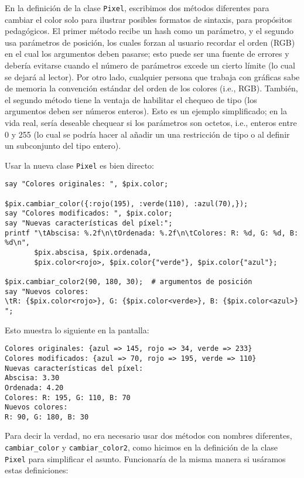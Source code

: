 En la definición de la clase {\tt Pixel}, escribimos dos métodos
diferentes para cambiar el color solo para ilustrar posibles 
formatos de sintaxis, para propósitos pedagógicos. El primer método
recibe un hash como un parámetro, y el segundo usa parámetros de posición,
los cuales forzan al usuario recordar el orden (RGB) en el cual los
argumentos deben pasarse; esto puede ser una fuente de errores y 
debería evitarse cuando el número de parámetros excede un cierto 
límite (lo cual se dejará al lector). Por otro lado, cualquier 
persona que trabaja con gráficas sabe de memoria la convención estándar 
del orden de los colores (i.e., RGB). También, el segundo método
tiene la ventaja de habilitar el chequeo de tipo (los argumentos
deben ser números enteros). Esto es un ejemplo simplificado; en la
vida real, sería deseable chequear si los parámetros son octetos, i.e.,
enteros entre 0 y 255 (lo cual se podría hacer al añadir un
una restricción de tipo o al definir un subconjunto del tipo entero).

Usar la nueva clase {\tt Pixel} es bien directo:

\begin{verbatim}
say "Colores originales: ", $pix.color;

$pix.cambiar_color({:rojo(195), :verde(110), :azul(70),});
say "Colores modificados: ", $pix.color;
say "Nuevas características del píxel:";
printf "\tAbscisa: %.2f\n\tOrdenada: %.2f\n\tColores: R: %d, G: %d, B: %d\n",
       $pix.abscisa, $pix.ordenada, 
       $pix.color<rojo>, $pix.color{"verde"}, $pix.color{"azul"};

$pix.cambiar_color2(90, 180, 30);  # argumentos de posición
say "Nuevos colores:  
\tR: {$pix.color<rojo>}, G: {$pix.color<verde>}, B: {$pix.color<azul>} ";
\end{verbatim}

Esto muestra lo siguiente en la pantalla:

\begin{verbatim}
Colores originales: {azul => 145, rojo => 34, verde => 233}
Colores modificados: {azul => 70, rojo => 195, verde => 110}
Nuevas características del píxel:
Abscisa: 3.30
Ordenada: 4.20
Colores: R: 195, G: 110, B: 70
Nuevos colores:  
R: 90, G: 180, B: 30 
\end{verbatim}

Para decir la verdad, no era necesario usar dos métodos con
nombres diferentes, \verb|cambiar_color| y \verb|cambiar_color2|,
como hicimos en la definición de la clase {\tt Pixel} para 
simplificar el asunto. Funcionaría de la misma manera si usáramos
estas definiciones:

